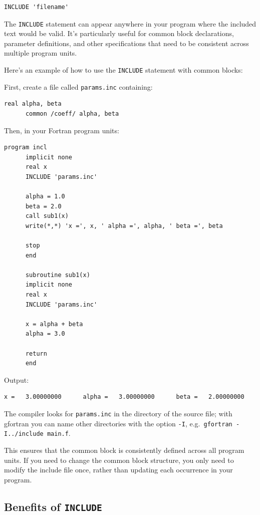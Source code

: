 \begin{lstlisting}[style=fortran77]
      INCLUDE 'filename'
\end{lstlisting}

The \texttt{INCLUDE} statement can appear anywhere in your program where the included text would be valid. It's particularly useful for common block declarations, parameter definitions, and other specifications that need to be consistent across multiple program units.

Here's an example of how to use the \texttt{INCLUDE} statement with common blocks:

First, create a file called \texttt{params.inc} containing:

\begin{lstlisting}[style=fortran77]
      real alpha, beta
      common /coeff/ alpha, beta
\end{lstlisting}

Then, in your Fortran program units:

\begin{lstlisting}[style=fortran77]
      program incl
      implicit none
      real x
      INCLUDE 'params.inc'

      alpha = 1.0
      beta = 2.0
      call sub1(x)
      write(*,*) 'x =', x, ' alpha =', alpha, ' beta =', beta

      stop
      end

      subroutine sub1(x)
      implicit none
      real x
      INCLUDE 'params.inc'

      x = alpha + beta
      alpha = 3.0

      return
      end
\end{lstlisting}

Output:

\begin{lstlisting}[style=output]
 x =   3.00000000      alpha =   3.00000000      beta =   2.00000000
\end{lstlisting}

The compiler looks for \texttt{params.inc} in the directory of the source file; with gfortran you can name other directories with the option \texttt{-I}, e.g.\ \texttt{gfortran -I../include main.f}.

This ensures that the common block is consistently defined across all program units. If you need to change the common block structure, you only need to modify the include file once, rather than updating each occurrence in your program.

\subsection{Benefits of \texttt{INCLUDE}}

